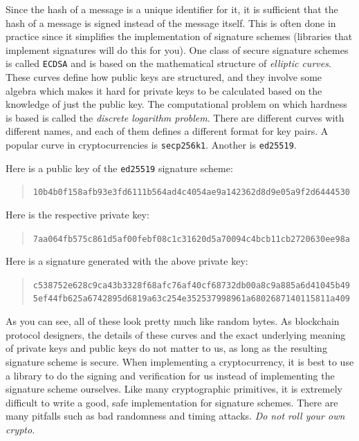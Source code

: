Since the hash of a message is a unique identifier for it, it is sufficient that
the hash of a message is signed instead of the message itself. This is often done
in practice since it simplifies the implementation of signature schemes (libraries that implement
signatures will do this for you).
One class of secure signature schemes is called
\texttt{ECDSA} and is based on the mathematical structure of \emph{elliptic curves}.
These curves define how public keys are structured, and they involve some algebra
which makes it hard for private keys to be calculated based on the knowledge of
just the public key. The computational problem on which hardness is based is called
the \emph{discrete logarithm problem}.
There are different curves with different names, and each of them
defines a different format for key pairs.
A popular curve in cryptocurrencies is
\texttt{secp256k1}. Another is \texttt{ed25519}.

Here is a public key of the \texttt{ed25519} signature scheme:

\begin{quote}
\texttt{10b4b0f158afb93e3fd6111b564ad4c4054ae9a142362d8d9e05a9f2d6444530}
\end{quote}

Here is the respective private key:

\begin{quote}
\texttt{7aa064fb575c861d5af00febf08c1c31620d5a70094c4bcb11cb2720630ee98a}
\end{quote}

Here is a signature generated with the above private key:

\begin{quote}
\texttt{c538752e628c9ca43b3328f68afc76af40cf68732db00a8c9a885a6d41045b49}\linebreak
\texttt{5ef44fb625a6742895d6819a63c254e352537998961a6802687140115811a409}
\end{quote}

As you can see, all of these look pretty much like random bytes.
As blockchain protocol designers,
the details of these curves and the exact underlying meaning of private keys and public keys
do not matter to us, as long as the resulting signature
scheme is secure. When implementing a cryptocurrency, it is best to use a library
to do the signing and verification for us instead of implementing the signature
scheme ourselves. Like many cryptographic primitives, it is extremely difficult to
write a good, safe implementation for signature schemes. There are many pitfalls
such as bad randomness and timing attacks. \emph{Do not roll your own crypto.}

